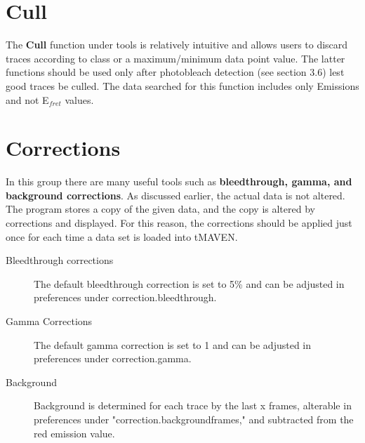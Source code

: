 \documentclass[11pt,a5paper,footinclude=true,headinclude=true]{scrbook} %
\begin{document}
     
   

    
    
    
    
     
   
    \section{Cull}
    The \textbf{Cull} function under tools is relatively intuitive and allows users to discard traces according to class or a maximum/minimum data point value. The latter functions should be used only after photobleach detection (see section 3.6) lest good traces be culled. The data searched for this function includes only Emissions and not E$_{fret}$ values.
    
    \section{Corrections}
    In this group there are many useful tools such as \textbf{bleedthrough, gamma, and background corrections}. As discussed earlier, the actual data is not altered. The program stores a copy of the given data, and the copy is altered by corrections and displayed. For this reason, the corrections should be applied just once for each time a data set is loaded into tMAVEN.  
   
    \begin{description}
    \item [Bleedthrough corrections] The default bleedthrough correction is set to 5\% and can be adjusted in preferences under correction.bleedthrough.
    \item[Gamma Corrections] The default gamma correction is set to 1 and can be adjusted in preferences under correction.gamma. 
    \item[Background] Background is determined for each trace by the last x frames, alterable in preferences under "correction.backgroundframes," and subtracted from the red emission value.
    
    \end{description}
\end{document}
